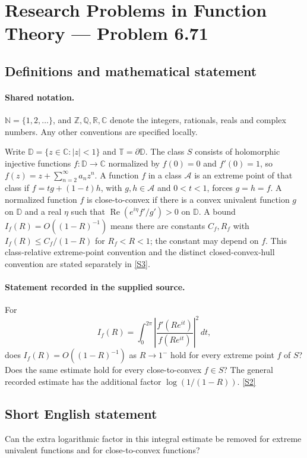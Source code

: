 \documentclass[11pt]{article}
\newcommand{\sref}[2]{\hyperlink{source:#1:#2}{[S#2]}}
\begin{document}
\section{Research Problems in Function Theory — Problem 6.71}\label{statement}

\subsection{Definitions and mathematical statement}

\paragraph{Shared notation.}$\mathbb N=\{1,2,\ldots\}$, and $\mathbb Z,\mathbb Q,\mathbb R,\mathbb C$ denote the integers, rationals, reals and complex numbers. Any other conventions are specified locally.


Write $\mathbb D=\{z\in\mathbb C:|z|<1\}$ and $\mathbb T=\partial\mathbb D$. The class $S$ consists of holomorphic injective functions $f:\mathbb D\to\mathbb C$ normalized by $f(0)=0$ and $f'(0)=1$, so $f(z)=z+\sum_{n=2}^{\infty}a_nz^n$. A function $f$ in a class $\mathcal A$ is an extreme point of that class if $f=tg+(1-t)h$, with $g,h\in\mathcal A$ and $0<t<1$, forces $g=h=f$. A normalized function $f$ is close-to-convex if there is a convex univalent function $g$ on $\mathbb D$ and a real $\eta$ such that $\operatorname{Re}(e^{i\eta}f'/g')>0$ on $\mathbb D$. A bound $I_f(R)=O((1-R)^{-1})$ means there are constants $C_f,R_f$ with $I_f(R)\le C_f/(1-R)$ for $R_f<R<1$; the constant may depend on $f$. This class-relative extreme-point convention and the distinct closed-convex-hull convention are stated separately in \sref{statement}{3}.
\paragraph{Statement recorded in the supplied source.}
For \[I_f(R)=\int_0^{2\pi}\left|\frac{f'(Re^{it})}{f(Re^{it})}\right|^2\,dt,\] does $I_f(R)=O((1-R)^{-1})$ as $R\to1^-$ hold for every extreme point $f$ of $S$? Does the same estimate hold for every close-to-convex $f\in S$? The general recorded estimate has the additional factor $\log(1/(1-R))$. \sref{statement}{2}
\subsection{Short English statement}
Can the extra logarithmic factor in this integral estimate be removed for extreme univalent functions and for close-to-convex functions?
\end{document}
